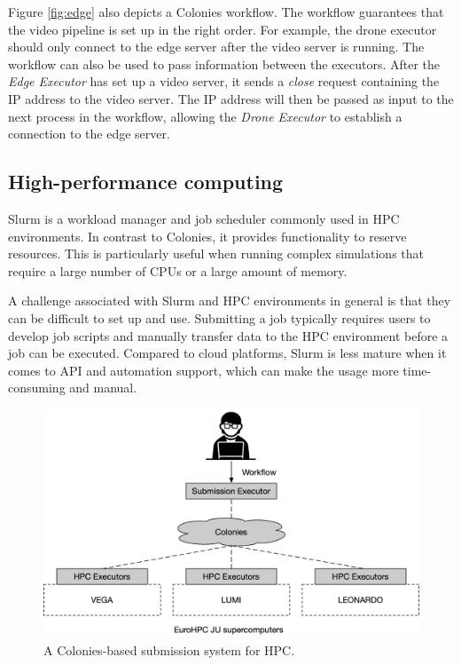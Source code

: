 \documentclass{article}
\begin{document}
Figure \ref{fig:edge} also depicts a Colonies workflow. The workflow guarantees that the video pipeline is set up in the right order. For example, the drone executor should only connect to the edge server after the video server is running. The workflow can also be used to pass information between the executors. After the \emph{Edge Executor} has set up a video server, it sends a \emph{close} request containing the IP address to the video server. The IP address will then be passed as input to the next process in the workflow, allowing the \emph{Drone Executor} to establish a connection to the edge server.

\subsection{High-performance computing}
\label{hpc_use_case}
Slurm \cite{slurm} is a workload manager and job scheduler commonly used in HPC environments. In contrast to Colonies, it provides functionality to reserve resources. This is particularly useful when running complex simulations that require a large number of CPUs or a large amount of memory. 

A challenge associated with Slurm and HPC environments in general is that they can be difficult to set up and use. Submitting a job typically requires users to develop job scripts and manually transfer data to the HPC environment before a job can be executed. Compared to cloud platforms, Slurm is less mature when it comes to API and automation support, which can make the usage more time-consuming and manual.

\begin{figure}[h]
	\centering
    \includegraphics[scale=0.43]{hpc_overlay.png}
	\caption{A Colonies-based submission system for HPC.}
	\label{fig:hpc_overlay}
\end{figure}
\end{document}
